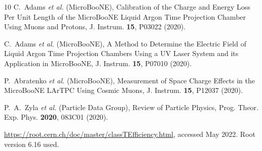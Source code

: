 \documentclass[aps,prl,twocolumn,superscriptaddress]{revtex4}
\begin{document}
\begin{thebibliography}{10}
C.~Adams \textit{et al.} (MicroBooNE),
Calibration of the Charge and Energy Loss Per Unit Length of the MicroBooNE Liquid Argon Time Projection Chamber Using Muons and Protons,
J. Instrum. \textbf{15}, P03022 (2020).

C.~Adams \textit{et al.} (MicroBooNE),
A Method to Determine the Electric Field of Liquid Argon Time Projection Chambers Using a UV Laser System and its Application in MicroBooNE,
J. Instrum. \textbf{15}, P07010 (2020).

P.~Abratenko \textit{et al.} (MicroBooNE),
Measurement of Space Charge Effects in the MicroBooNE LArTPC Using Cosmic Muons,
J. Instrum. \textbf{15}, P12037 (2020).

P.~A.~Zyla \textit{et al.} (Particle Data Group),
Review of \mbox{Particle} Physics,
Prog. Theor. Exp. Phys. \textbf{2020}, 083C01 (2020).

\url{https://root.cern.ch/doc/master/classTEfficiency.html}, accessed May 2022. Root version 6.16 used.

\end{thebibliography}
\end{document}
